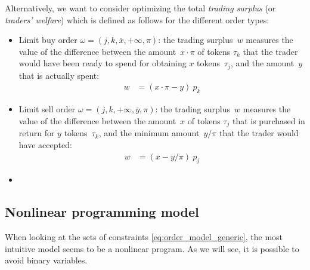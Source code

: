 \documentclass[11pt,parskip=full]{scrartcl}%
\begin{document}
Alternatively, we want to consider optimizing the total \emph{trading surplus}
(or \emph{traders' welfare}) which is defined as follows for the different order types:
\begin{itemize}
  \item Limit buy order $\omega = (j,k,\overline{x},+\infty,\pi)$:
  the trading surplus~$w$ measures the value of the difference between the amount~$x \cdot \pi$
  of tokens $\tau_k$ that the trader would have been ready to spend for obtaining $x$
  tokens~$\tau_j$, and the amount~$y$ that is actually spent:
  \begin{align*}
    w &= ( x \cdot \pi - y ) \> p_k
  \end{align*}

  \item Limit sell order $\omega = (j,k,+\infty,\overline{y},\pi)$:
  the trading surplus~$w$ measures the value of the difference between the amount~$x$ of tokens
  $\tau_j$ that is purchased in return for $y$ tokens~$\tau_k$, and the minimum
  amount~$ y / \pi $ that the trader would have accepted:
  \begin{align*}
    w &= ( x - y / \pi ) \> p_j%
  \end{align*}

  \item {}
\end{itemize}



\newpage
\subsection{Nonlinear programming model}
\label{subsec:NLPmodel}

When looking at the sets of constraints \eqref{eq:order_model_generic}, the most intuitive model
seems to be a nonlinear program.
As we will see, it is possible to avoid binary variables.
\end{document}
